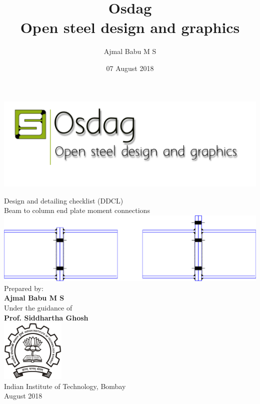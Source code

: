 \documentclass[11.5pt,a4paper,oneside]{report}
\begin{document}
	\title{Osdag\\ Open steel design and graphics}
	\author{Ajmal Babu M S}
	\date{07 August 2018}
\pagestyle{fancy}
\lhead{}
\chead{}
\cfoot{}
\rfoot{\thepage}
\renewcommand{\headrulewidth}{2pt}
\renewcommand{\footrulewidth}{1pt}
\newcommand{\univ}{Indian Institute of Technology, Bombay}
\begin{titlepage}
	\begin{center}
		\begin{center}
			\includegraphics {logoOsdag.png}
		\end{center}
			{\LARGE {Design and detailing checklist (DDCL)}}\\
			\vspace{1cm}
			{\LARGE {Beam to column end plate  moment connections}} \\
			\vspace{1cm}		
			\includegraphics[width=7in]{FP_OWE.png} \\	
			\vspace{3cm}
			 {\small {Prepared by:}} \\
			 {\Large \textbf {Ajmal Babu M S}} \\	
			\vspace{0.5cm}	
			{\small {Under the guidance of} }\\
			{\Large \textbf {Prof. Siddhartha Ghosh}} \\	
			\vspace{1cm}
			\centering
			\includegraphics[width=1.2in]{logo.png} \\	
 			\vspace{0.5cm}
			{\univ} \\ 
			\vspace{0.15cm}		
			{August 2018}
	\end{center}
\end{titlepage}
\end{document}
